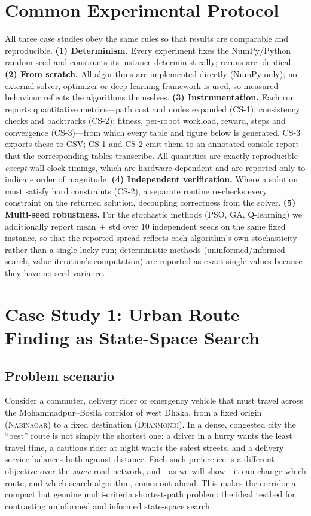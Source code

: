 \documentclass[10pt]{article}
\begin{document}
\section{Common Experimental Protocol}
All three case studies obey the same rules so that results are comparable and
reproducible. \textbf{(1) Determinism.} Every experiment fixes the NumPy/Python
random seed and constructs its instance deterministically; reruns are identical.
\textbf{(2) From scratch.} All algorithms are implemented directly (NumPy only);
no external solver, optimizer or deep-learning framework is used, so measured
behaviour reflects the algorithms themselves. \textbf{(3) Instrumentation.} Each
run reports quantitative metrics---path cost and nodes expanded (CS-1);
consistency checks and backtracks (CS-2); fitness, per-robot workload, reward,
steps and convergence (CS-3)---from which every table and figure below is
generated. CS-3 exports these to CSV; CS-1 and CS-2 emit them to an annotated
console report that the corresponding tables transcribe. All quantities are
exactly reproducible \emph{except} wall-clock timings, which are
hardware-dependent and are reported only to indicate order of magnitude.
\textbf{(4) Independent verification.} Where a solution must satisfy hard
constraints (CS-2), a separate routine re-checks every constraint on the returned
solution, decoupling correctness from the solver. \textbf{(5) Multi-seed
robustness.} For the stochastic methods (PSO, GA, Q-learning) we additionally
report mean$\,\pm\,$std over $10$ independent seeds on the same fixed instance, so
that the reported spread reflects each algorithm's own stochasticity rather than a
single lucky run; deterministic methods (uninformed/informed search, value
iteration's computation) are reported as exact single values because they have no
seed variance.

\section{Case Study 1: Urban Route Finding as State-Space Search}
\subsection{Problem scenario}
Consider a commuter, delivery rider or emergency vehicle that must travel across
the Mohammadpur--Bosila corridor of west Dhaka, from a fixed origin
(\textsc{Nabinagar}) to a fixed destination (\textsc{Dhanmondi}). In a dense,
congested city the ``best'' route is not simply the shortest one: a driver in a
hurry wants the least travel time, a cautious rider at night wants the safest
streets, and a delivery service balances both against distance. Each such
preference is a different objective over the \emph{same} road network, and---as
we will show---it can change which route, and which search algorithm, comes out
ahead. This makes the corridor a compact but genuine multi-criteria
shortest-path problem: the ideal testbed for contrasting uninformed and informed
state-space search.
\end{document}
